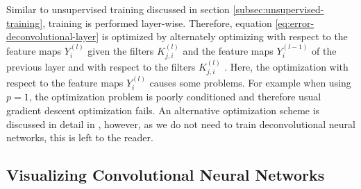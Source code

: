 Similar to unsupervised training discussed in section \ref{subsec:unsupervised-training}, training is performed layer-wise. Therefore, equation \eqref{eq:error-deconvolutional-layer} is optimized by alternately optimizing with respect to the feature maps $Y_i^{(l)}$ given the filters $K_{j,i}^{(l)}$ and the feature maps $Y_i^{(l-1)}$ of the previous layer and with respect to the filters $K_{j,i}^{(l)}$ \cite{ZeilerKrishnanTaylorFergus:2010}. Here, the optimization with respect to the feature maps $Y_i^{(l)}$ causes some problems. For example when using $p = 1$, the optimization problem is poorly conditioned \cite{ZeilerKrishnanTaylorFergus:2010} and therefore usual gradient descent optimization fails. An alternative optimization scheme is discussed in detail in \cite{ZeilerKrishnanTaylorFergus:2010}, however, as we do not need to train deconvolutional neural networks, this is left to the reader.

\subsection{Visualizing Convolutional Neural Networks}
\label{subsec:visualizing-convolutional-networks}

